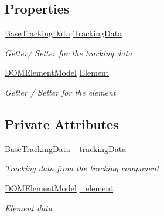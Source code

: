 \subsection*{Properties}
\begin{DoxyCompactItemize}
\item 
\hyperlink{class_web_analyzer_1_1_models_1_1_base_1_1_base_tracking_data}{Base\+Tracking\+Data} \hyperlink{class_web_analyzer_1_1_models_1_1_data_model_1_1_position_data_model_a1a065fa193e20137daa08472eefafd66}{Tracking\+Data}
\begin{DoxyCompactList}\small\item\em Getter/ Setter for the tracking data \end{DoxyCompactList}\item 
\hyperlink{class_web_analyzer_1_1_models_1_1_data_model_1_1_d_o_m_element_model}{D\+O\+M\+Element\+Model} \hyperlink{class_web_analyzer_1_1_models_1_1_data_model_1_1_position_data_model_a4825afc0a1ecf3eeb0876be8611111ba}{Element}
\begin{DoxyCompactList}\small\item\em Getter / Setter for the element \end{DoxyCompactList}\end{DoxyCompactItemize}
\subsection*{Private Attributes}
\begin{DoxyCompactItemize}
\item 
\hyperlink{class_web_analyzer_1_1_models_1_1_base_1_1_base_tracking_data}{Base\+Tracking\+Data} \hyperlink{class_web_analyzer_1_1_models_1_1_data_model_1_1_position_data_model_a64809478becce669e0c67a035711df49}{\+\_\+tracking\+Data}
\begin{DoxyCompactList}\small\item\em Tracking data from the tracking component \end{DoxyCompactList}\item 
\hyperlink{class_web_analyzer_1_1_models_1_1_data_model_1_1_d_o_m_element_model}{D\+O\+M\+Element\+Model} \hyperlink{class_web_analyzer_1_1_models_1_1_data_model_1_1_position_data_model_a2f78c931c2eaded13347f182a79968e4}{\+\_\+element}
\begin{DoxyCompactList}\small\item\em Element data \end{DoxyCompactList}\end{DoxyCompactItemize}


